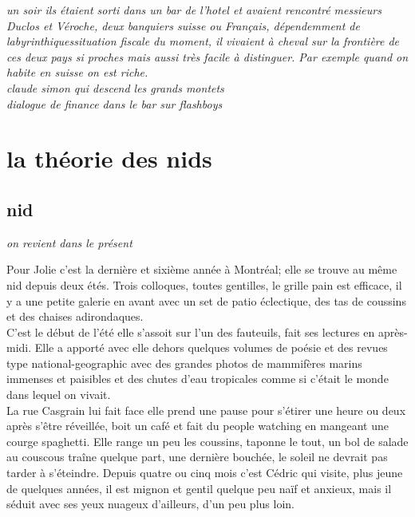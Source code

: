 \documentclass{article}
\begin{document}
\textit{un soir ils étaient sorti dans un bar de l'hotel et avaient rencontré
  messieurs Duclos et Véroche, deux banquiers suisse ou Français, dépendemment
  de labyrinthiquessituation fiscale du moment, il vivaient à cheval sur la
  frontière de ces deux pays si proches mais aussi très facile à distinguer. Par
  exemple quand on habite en suisse on est riche. }\\

\textit{claude simon qui descend les grands montets}\\

\textit{dialogue de finance dans le bar sur flashboys}\\





\clearpage


\section{la théorie des nids}

\subsection{nid}

\textit{on revient dans le présent}

Pour Jolie c’est la dernière et sixième année à Montréal; elle se
trouve au même nid depuis deux étés. Trois colloques, toutes
gentilles, le grille pain est efficace, il y a une petite galerie en
avant avec un set de patio éclectique, des tas de coussins et des
chaises adirondaques. \\

C’est le début de l’été elle s’assoit sur l’un
des fauteuils, fait ses lectures en après-midi. Elle a apporté avec
elle dehors quelques volumes de poésie et des revues type
national-geographic avec des grandes photos de mammifères marins
immenses et paisibles et des chutes d’eau tropicales comme si c’était
le monde dans lequel on vivait. \\

La rue Casgrain lui fait face elle
prend une pause pour s’étirer une heure ou deux après s’être
réveillée, boit un café et fait du people watching en mangeant une
courge spaghetti. Elle range un peu les coussins, taponne le tout, un
bol de salade au couscous traîne quelque part, une dernière bouchée,
le soleil ne devrait pas tarder à s’éteindre. Depuis quatre ou cinq
mois c’est Cédric qui visite, plus jeune de quelques années, il est
mignon et gentil quelque peu naïf et anxieux, mais il séduit avec ses
yeux nuageux d’ailleurs, d’un peu plus loin.\\
\end{document}
